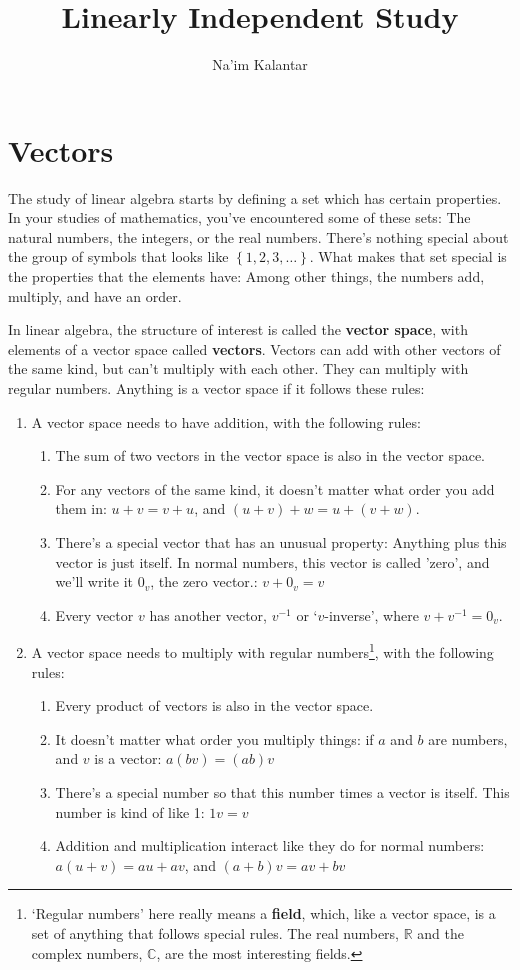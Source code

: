 \documentclass{article}
\title{Linearly Independent Study}
\author{Na'im Kalantar}
\begin{document}
\maketitle
\section{Vectors}
The study of linear algebra starts by defining a set which has certain properties. 
In your studies of mathematics, you've encountered some of these sets: The natural numbers, the integers, or the real numbers. There's nothing special about the group of symbols that looks like $\left\{1, 2, 3, \dots\right\}$. What makes that set special is the properties that the elements have: Among other things, the numbers add, multiply, and have an order.

In linear algebra, the structure of interest is called the \textbf{vector space}, with elements of a vector space called \textbf{vectors}. Vectors can add with other vectors of the same kind, but can't multiply with each other. They can multiply with regular numbers. Anything is a vector space if it follows these rules:
\begin{enumerate}
    \item A vector space needs to have addition, with the following rules:
        \begin{enumerate}
            \item The sum of two vectors in the vector space is also in the vector space.
            \item For any vectors of the same kind, it doesn't matter what order you add them in: $u+v = v+u$, and $(u+v)+w = u+(v+w)$.
            \item There's a special vector that has an unusual property: Anything plus this vector is just itself. In normal numbers, this vector is called 'zero', and we'll write it $0_v$, the zero vector.: $v + 0_v = v$
            \item Every vector $v$ has another vector, $v^{-1}$ or `$v$-inverse', where $v + v^{-1} = 0_v$. 
        \end{enumerate}
    \item A vector space needs to multiply with regular numbers\footnote{`Regular numbers' here really means a \textbf{field}, which, like a vector space, is a set of anything that follows special rules. The real numbers, $\mathbb{R}$ and the complex numbers, $\mathbb{C}$, are the most interesting fields.}, with the following rules:
        \begin{enumerate}
            \item Every product of vectors is also in the vector space. 
            \item It doesn't matter what order you multiply things: if $a$ and $b$ are numbers, and $v$ is a vector: $a(bv) = (ab)v$
            \item There's a special number so that this number times a vector is itself. This number is kind of like 1: $1v = v$
            \item Addition and multiplication interact like they do for normal numbers: $a(u+v) = au + av$, and $(a+b)v = av + bv$
        \end{enumerate}
\end{enumerate}
\end{document}

